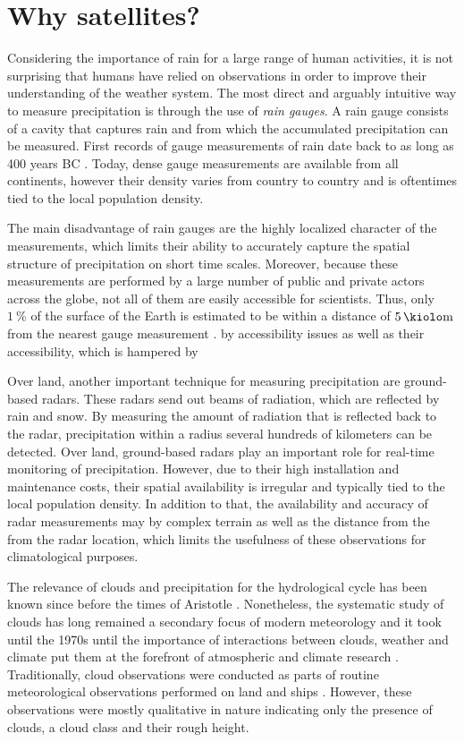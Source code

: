 \section{Why satellites?}

Considering the importance of rain for a large range of human activities, it is
not surprising that humans have relied on observations in order to improve their
understanding of the weather system. The most direct and arguably intuitive way
to measure precipitation is through the use of \textit{rain gauges}. A rain
gauge consists of a cavity that captures rain and from which the accumulated
precipitation can be measured. First records of gauge measurements of rain date
back to as long as 400 years BC \citep{strangeways2000}. Today, dense gauge
measurements are available from all continents, however their density varies
from country to country and is oftentimes tied to the local population density.

The main disadvantage of rain gauges are the highly localized character of the
measurements, which limits their ability  to accurately capture the
spatial structure of precipitation on short time scales. Moreover, because
these measurements are performed by a large number of public and private
actors across the globe, not all of them are easily accessible for
scientists. Thus, only $\SI{1}{\percent}$ of the surface of the Earth is
estimated to be within a distance of $\SI{5}{\kiolo \meter}$ from the nearest
gauge measurement \citep{kidd17}.
by accessibility issues as well as their accessibility, which is hampered by

Over land, another important technique for measuring precipitation are
ground-based radars. These radars send out beams of radiation, which are
reflected by rain and snow. By measuring the amount of radiation that is
reflected back to the radar, precipitation within a radius several hundreds of
kilometers can be detected. Over land, ground-based radars play an important
role for real-time monitoring of precipitation. However, due to their high
installation and maintenance costs, their spatial availability is irregular and
typically tied to the local population density. In addition to that, the
availability and accuracy of radar measurements may by complex terrain as well
as the distance from the from the radar location, which limits the usefulness of
these observations for climatological purposes.

The relevance of clouds and precipitation for the hydrological cycle has been
known since before the times of Aristotle \citep{frisinger72}. Nonetheless, the
systematic study of clouds has long remained a secondary focus of modern
meteorology and it took until the 1970s until the importance of interactions
between clouds, weather and climate put them at the forefront of atmospheric and
climate research \citep{stephens02}. Traditionally, cloud observations were
conducted as parts of routine meteorological observations performed on land and
ships \citep{hughes84}. However, these observations were mostly qualitative in
nature indicating only the presence of clouds, a cloud class and their rough
height. 

